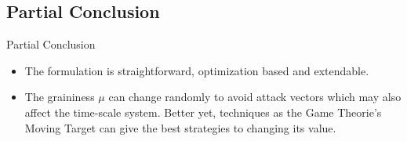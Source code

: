 
\subsection{Partial Conclusion}%
\label{subsec:ts-conclusion}

\begin{slide}{Partial Conclusion}
  \begin{itemize}
    \item The formulation is straightforward, optimization based and extendable.
    \item The graininess \(\mu\) can change randomly to avoid attack vectors
          which may also affect the time-scale system. Better yet, techniques as
          the Game Theorie's Moving Target can give the best strategies to
          changing its value.
  \end{itemize}
\end{slide}
